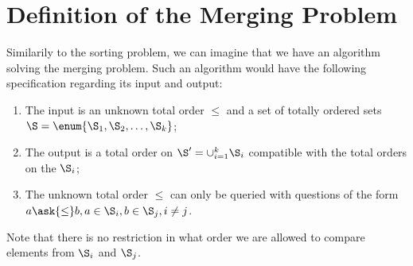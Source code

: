 \section{Definition of the Merging Problem}
\label{tree:merging:def}

Similarily to the sorting problem, we can imagine that we have an algorithm
solving the merging problem. Such an algorithm would have the following
specification regarding its input and output:

\begin{enumerate}
\item The input is an unknown total order \(\le\) and a set of totally ordered
sets \(\S = \enum{\S_1, \S_2, \ldots, \S_k}\);
\item The output is a total order on \(\S' = \cup_{i=1}^{k} \S_i\) compatible with
the total orders on the \(\S_i\);
\item The unknown total order \(\le\) can only be queried with questions of the
form \(a \ask{\le} b, a \in \S_i, b \in \S_j, i \neq j\).
\end{enumerate}

Note that there is no restriction in what order we are allowed to compare
elements from \(\S_i\) and \(\S_j\).

